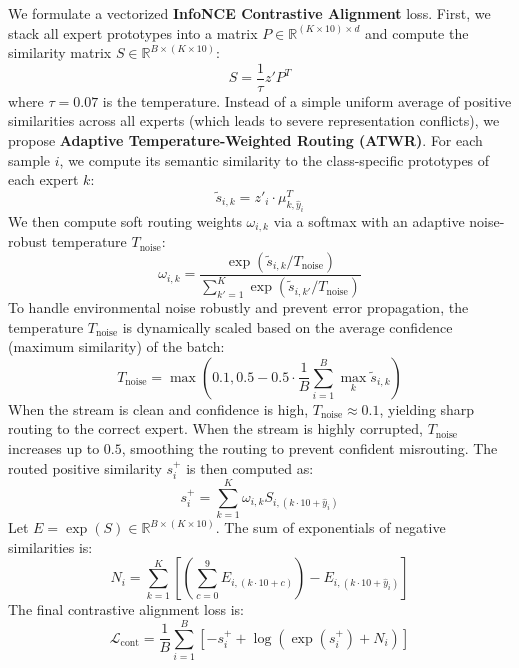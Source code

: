 \documentclass{article}
\theoremstyle{plain}
\theoremstyle{definition}
\theoremstyle{remark}
\begin{document}
We formulate a vectorized \textbf{InfoNCE Contrastive Alignment} loss. First, we stack all expert prototypes into a matrix $P \in \mathbb{R}^{(K \times 10) \times d}$ and compute the similarity matrix $S \in \mathbb{R}^{B \times (K \times 10)}$:
\begin{equation}
S = \frac{1}{\tau} z' P^T
\end{equation}
where $\tau = 0.07$ is the temperature. Instead of a simple uniform average of positive similarities across all experts (which leads to severe representation conflicts), we propose \textbf{Adaptive Temperature-Weighted Routing (ATWR)}. For each sample $i$, we compute its semantic similarity to the class-specific prototypes of each expert $k$:
\begin{equation}
\tilde{s}_{i,k} = z'_i \cdot \mu_{k, \hat{y}_i}^T
\end{equation}
We then compute soft routing weights $\omega_{i,k}$ via a softmax with an adaptive noise-robust temperature $T_{\text{noise}}$:
\begin{equation}
\omega_{i,k} = \frac{\exp(\tilde{s}_{i,k} / T_{\text{noise}})}{\sum_{k'=1}^K \exp(\tilde{s}_{i,k'} / T_{\text{noise}})}
\end{equation}
To handle environmental noise robustly and prevent error propagation, the temperature $T_{\text{noise}}$ is dynamically scaled based on the average confidence (maximum similarity) of the batch:
\begin{equation}
T_{\text{noise}} = \max\left(0.1, 0.5 - 0.5 \cdot \frac{1}{B} \sum_{i=1}^B \max_{k} \tilde{s}_{i,k}\right)
\end{equation}
When the stream is clean and confidence is high, $T_{\text{noise}} \approx 0.1$, yielding sharp routing to the correct expert. When the stream is highly corrupted, $T_{\text{noise}}$ increases up to $0.5$, smoothing the routing to prevent confident misrouting. The routed positive similarity $s_i^+$ is then computed as:
\begin{equation}
s_i^+ = \sum_{k=1}^K \omega_{i,k} S_{i, (k \cdot 10 + \hat{y}_i)}
\end{equation}
Let $E = \exp(S) \in \mathbb{R}^{B \times (K \times 10)}$. The sum of exponentials of negative similarities is:
\begin{equation}
N_i = \sum_{k=1}^K \left[ \left( \sum_{c=0}^9 E_{i, (k \cdot 10 + c)} \right) - E_{i, (k \cdot 10 + \hat{y}_i)} \right]
\end{equation}
The final contrastive alignment loss is:
\begin{equation}
\mathcal{L}_{\text{cont}} = \frac{1}{B} \sum_{i=1}^B \left[ -s_i^+ + \log\left( \exp(s_i^+) + N_i \right) \right]
\end{equation}
\end{document}
